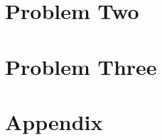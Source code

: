 \documentclass[letterpaper, 10pt,DIV=13]{scrartcl}
\numberwithin{equation}{section} %
\numberwithin{figure}{section} %
\numberwithin{table}{section} %
\begin{document}

\pagebreak

\section{Problem Two}


\pagebreak

\section{Problem Three}


\pagebreak


 

\pagebreak


\section{Appendix}
\end{document}
